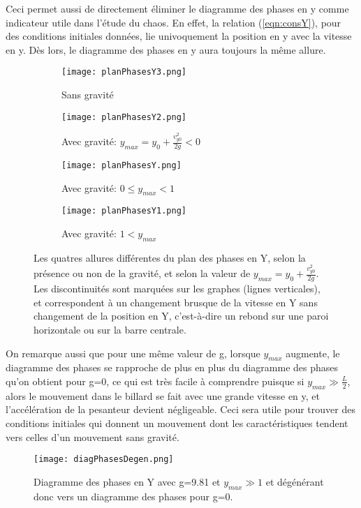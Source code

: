 \documentclass[a4paper]{report}
\begin{document}
Ceci permet aussi de directement éliminer le diagramme des phases en y comme indicateur utile dans l'étude du chaos. En effet, la relation (\ref{eqn:consY}), pour des conditions initiales données, lie univoquement la position en y avec la vitesse en y. Dès lors, le diagramme des phases en y aura toujours la même allure.
\begin{figure}[h!]
        \centering
        \begin{subfigure}[h!]{0.5\textwidth}
                \texttt{[image: planPhasesY3.png]}
                \caption{Sans gravité}
        \end{subfigure}\begin{subfigure}[h!]{0.5\textwidth}
                \texttt{[image: planPhasesY2.png]}
                \caption{Avec gravité: \(y_{max}=y_0 + \frac{v^2_{y0}}{2g} < 0 \) }
        \end{subfigure}

        \begin{subfigure}[h!]{0.5\textwidth}
                \texttt{[image: planPhasesY.png]}
                \caption{Avec gravité: \(0 \leq y_{max} < 1 \)}
        \end{subfigure}\begin{subfigure}[h!]{0.5\textwidth}
                \texttt{[image: planPhasesY1.png]}
                \caption{Avec gravité: \(1<y_{max}\)}
        \end{subfigure}
        \caption[Les quatres allures différentes du plan des phases en Y]{Les quatres allures différentes du plan des phases en Y, selon la présence ou non de la gravité, et selon la valeur de \(y_{max}=y_0 + \frac{v^2_{y0}}{2g}\). Les discontinuités sont marquées sur les graphes (lignes verticales), et correspondent à un changement brusque de la vitesse en Y sans changement de la position en Y, c'est-à-dire un rebond sur une paroi horizontale ou sur la barre centrale.}
\end{figure}

On remarque aussi que pour une même valeur de g, lorsque \(y_{max}\) augmente, le diagramme des phases se rapproche de plus en plus du diagramme des phases qu'on obtient pour g=0, ce qui est très facile à comprendre puisque si \(y_{max}\gg\frac{L}{2}\), alors le mouvement dans le billard se fait avec une grande vitesse en y, et l'accélération de la pesanteur devient négligeable. Ceci sera utile pour trouver des conditions initiales qui donnent un mouvement dont les caractéristiques tendent vers celles d'un mouvement sans gravité.
\begin{figure}[h!]
   \texttt{[image: diagPhasesDegen.png]}
      \caption[Diagramme des phases en Y avec g=9,81 dégénérant vers g=0]{Diagramme des phases en Y avec g=9.81 et \(y_{max}\gg 1 \) et dégénérant donc vers un diagramme des phases pour g=0.}
\end{figure}
\end{document}
